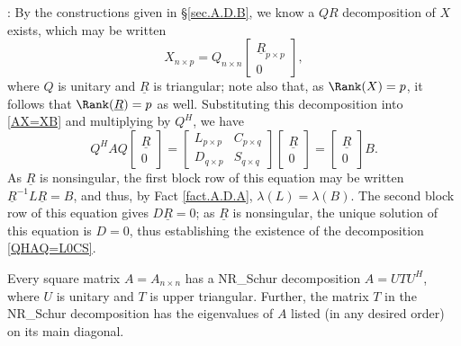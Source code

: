 \/: By the constructions given in \S \ref{sec.A.D.B}, we
know a $QR$ decomposition of $X$ exists, which may be written
\begin{equation*} X_{n\times p}=Q_{n\times n}\begin{bmatrix} \underline{R}_{p\times p} \\ 0 \end{bmatrix},
\end{equation*}
where $Q$ is unitary and $\underline{R}$ is triangular; note also
that, as $\Rank(X)=p$, it follows that $\Rank(\underline{R})=p$ as
well.  Substituting this decomposition into \eqref{AX=XB} and
multiplying by $Q^{H}$, we have
\begin{equation*}
Q^{H} A Q \begin{bmatrix} \underline{R} \\ 0 \end{bmatrix}
=\begin{bmatrix} L_{p\times p} & C_{p\times q} \\ D_{q\times p} & S_{q \times q} \end{bmatrix} \begin{bmatrix} \underline{R} \\ 0 \end{bmatrix}
=\begin{bmatrix} \underline{R} \\ 0 \end{bmatrix} B.
\end{equation*}
As $\underline{R}$ is nonsingular, the first block row of this
equation may be written $\underline{R}^{-1}L\underline{R}=B$, and
thus, by Fact \ref{fact.A.D.A}, $\lambda(L)=\lambda(B)$.  The second
block row of this equation gives $D \underline{R}=0$; as
$\underline{R}$ is nonsingular, the unique solution of this equation
is $D=0$, thus establishing the existence of the decomposition
\eqref{QHAQ=L0CS}.   \endproof

\begin{fact} \label{fact.A.D.C.Bb} Every square
matrix $A=A_{n\times n}$ has a NR_Schur decomposition $A=U T U^{H}$,
where $U$ is unitary and $T$ is upper triangular.  Further, the matrix
$T$ in the NR_Schur decomposition has the eigenvalues of $A$ listed (in
any desired order) on its main diagonal.
\end{fact}

